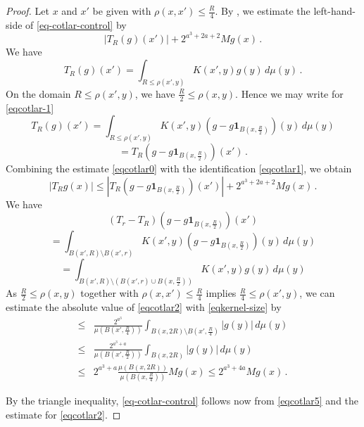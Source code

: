 \documentclass[10pt,a4paper]{article}
\theoremstyle{plain}
\theoremstyle{definition}
\numberwithin{equation}{subsection}
\newcommand{\leanok}{}
\begin{document}
\begin{proof}
\leanok
Let $x$ and $x'$ be given with $\rho(x,x')\le\frac {R}{4}$.
By , we estimate
the left-hand-side of
\eqref{eq-cotlar-control} by
\begin{equation}\label{eqcotlar0}
|T_R(g)(x')|+
2^{a^3 + 2a + 2} Mg(x)\,.
\end{equation}
We  have
\begin{equation}
\label{eqcotlar-1}
T_R(g)(x')=
\int_{R\le\rho(x',y)} K(x',y) g(y) \, d\mu(y)\, .
\end{equation}
On the domain $R\le\rho(x',y)$, we have $\frac {R}2\le\rho(x,y)$. Hence we may write
for \eqref{eqcotlar-1}
\begin{equation*}
T_R(g)(x')=\int_{R\le\rho(x',y)} K(x',y) (g-g\mathbf{1}_{B(x,\frac {R} 2)})(y) \,d\mu(y)
\end{equation*}
\begin{equation}\label{eqcotlar1}
=T_R(g-g\mathbf{1}_{B(x,\frac {R} 2)})(x')\, .
\end{equation}
Combining the estimate \eqref{eqcotlar0} with the identification \eqref{eqcotlar1}, we obtain
\begin{equation}\label{eqcotlar5}
\left|T_R g(x)
\right|\le
|T_R(g-g\mathbf{1}_{B(x,\frac {R} 2)})(x')|+
2^{a^3 + 2a + 2} Mg(x)\, .
\end{equation}
We  have
\begin{equation*}
(T_r-T_R)(g-g\mathbf{1}_{B(x,\frac {R} 2)})(x')
\end{equation*}
\begin{equation*}
= \int_{B(x',R)\setminus B(x',r)} K(x',y) (g-g\mathbf{1}_{B(x,\frac {R} 2)})(y) \,d\mu(y)
\end{equation*}
\begin{equation}\label{eqcotlar2}
= \int_{B(x',R)\setminus (B(x',r) \cup B(x,\frac{R}{2}))} K(x',y) g(y) \,d\mu(y)
\end{equation}
As $\frac{R}{2}\le\rho(x,y)$ together with $\rho(x,x')\le\frac {R}{4}$ implies
$\frac {R}{4}\le\rho(x',y)$, we can estimate the absolute value of \eqref{eqcotlar2} with \eqref{eqkernel-size} by
\begin{align*}
\le &\frac{2^{a^3}}{\mu(B(x',\frac{R}{4}))} \int_{B(x,2R)\setminus B(x',\frac{R}{4})}
|g(y)|\, d\mu(y) \\
\le &\frac{2^{a^3+a}}{\mu(B(x',\frac{R}{2}))} \int_{B(x,2R)}
|g(y)|\, d\mu(y) \\
\le &2^{a^3+a} \frac{\mu(B(x,2R))}{\mu(B(x,\frac{R}{4}))} Mg(x) \le 2^{a^3 + 4a} Mg(x)\, .
\end{align*}

By the triangle inequality, \eqref{eq-cotlar-control} follows now from \eqref{eqcotlar5} and the estimate for \eqref{eqcotlar2}.
\end{proof}
\end{document}
